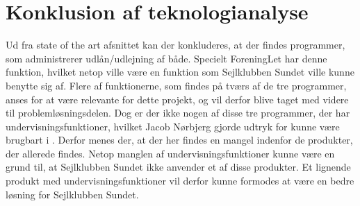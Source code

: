 \section{Konklusion af teknologianalyse}

Ud fra state of the art afsnittet kan der konkluderes, at der findes programmer, som administrerer udlån/udlejning af både.
Specielt ForeningLet har denne funktion, hvilket netop ville være en funktion som Sejlklubben Sundet ville kunne benytte sig af.
Flere af funktionerne, som findes på tværs af de tre programmer, anses for at være relevante for dette projekt, og vil derfor blive taget med videre til problemløsningsdelen.
Dog er der ikke nogen af disse tre programmer, der har undervisningsfunktioner, hvilket Jacob Nørbjerg gjorde udtryk for kunne være brugbart i . Derfor menes der, at der her findes en mangel indenfor de produkter, der allerede findes.
Netop manglen af undervisningsfunktioner kunne være en grund til, at Sejlklubben Sundet ikke anvender et af disse produkter.
Et lignende produkt med undervisningsfunktioner vil derfor kunne formodes at være en bedre løsning for Sejlklubben Sundet.

